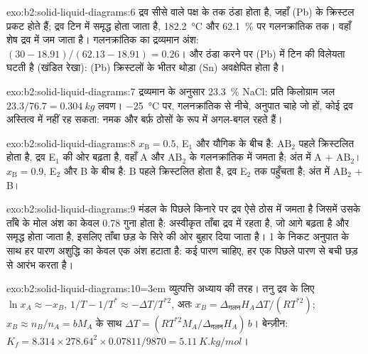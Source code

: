 \begin{solution}{exo:b2:solid-liquid-diagrams:6}
द्रव सीसे वाले पक्ष के  तक ठंडा होता है, जहाँ (Pb) के क्रिस्टल प्रकट होते हैं;
द्रव टिन में समृद्ध होता जाता है, \qty{182.2}{\degreeCelsius}
और 62.1~\% पर गलनक्रांतिक तक। वहाँ शेष द्रव  में जम जाता है।
गलनक्रांतिक का द्रव्यमान अंश: $(30 - 18.91)/(62.13 - 18.91) = 0.26$। और
ठंडा करने पर (Pb) में टिन की विलेयता घटती है (खंडित रेखा): (Pb) क्रिस्टलों के भीतर
थोड़ा (Sn) अवक्षेपित होता है।
\end{solution}

\begin{solution}{exo:b2:solid-liquid-diagrams:7}
द्रव्यमान के अनुसार 23.3~\% NaCl: प्रति किलोग्राम जल $23.3/76.7 = \qty{0.304}{kg}$
लवण। \qty{-25}{\degreeCelsius} पर, गलनक्रांतिक से नीचे, अनुपात चाहे जो हों, कोई
द्रव अस्तित्व में नहीं रह सकता: नमक और बर्फ़ ठोसों के रूप में अगल-बगल रहते हैं।
\end{solution}

\begin{solution}{exo:b2:solid-liquid-diagrams:8}
$x_{\mathrm B} = 0.5$, E$_1$ और यौगिक के बीच है: $\mathrm{AB_2}$
पहले क्रिस्टलित होता है, द्रव E$_1$ की ओर बढ़ता है, वहाँ A और $\mathrm{AB_2}$ के
गलनक्रांतिक में जमता है; अंत में A + $\mathrm{AB_2}$।
$x_{\mathrm B} = 0.9$, E$_2$ और B के बीच है: B पहले क्रिस्टलित होता है, द्रव
E$_2$ तक पहुँचता है; अंत में $\mathrm{AB_2}$ + B।
\end{solution}

\begin{solution}{exo:b2:solid-liquid-diagrams:9}
मंडल के पिछले किनारे पर द्रव ऐसे ठोस में जमता है जिसमें उसके ताँबे के मोल अंश का केवल 0.78
गुना होता है: अस्वीकृत ताँबा द्रव में रहता है, जो आगे बढ़ता है और
समृद्ध होता जाता है, इसलिए ताँबा छड़ के सिरे की ओर बुहार दिया जाता है।
1 के निकट अनुपात के साथ हर पारण अशुद्धि का केवल एक अंश हटाता है:
कई पारण चाहिए, हर एक पिछले पारण से बची छड़ से आरंभ करता है।
\end{solution}

\begin{solution}{exo:b2:solid-liquid-diagrams:10}\emergencystretch=3em
व्युत्पत्ति अध्याय की तरह। तनु द्रव के लिए $\ln x_A \approx -x_B$, $1/T -
1/T^* \approx -\Delta T/T^{*2}$, अतः $x_B = \Delta_{\text{गलन}}H_A\Delta T/(RT^{*2})$;
$x_B \approx n_B/n_A = bM_A$ के साथ $\Delta T = (RT^{*2}M_A/\Delta_{\text{गलन}}H_A)\,b$।
बेन्ज़ीन: $K_f = 8.314 \times 278.64^2 \times 0.07811/9870 = \qty{5.11}{K.kg/mol}$।
\end{solution}

